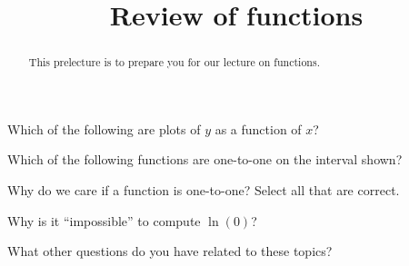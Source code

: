 \documentclass{ximera}
\title{Review of functions}
\begin{document}
\begin{abstract}
This prelecture is to prepare you for our lecture on functions.
\end{abstract}
\maketitle

\begin{question}
Which of the following are plots of $y$ as a function of $x$?
\end{question}

\begin{question}
Which of the following functions are one-to-one on the interval shown?
\end{question}

\begin{question}
Why do we care if a function is one-to-one? Select all that are
correct.
\end{question}

\begin{question}
Why is it ``impossible'' to compute $\ln(0)$?
\end{question}

\begin{question}
What other questions do you have related to these topics?
\end{question}
\end{document}
